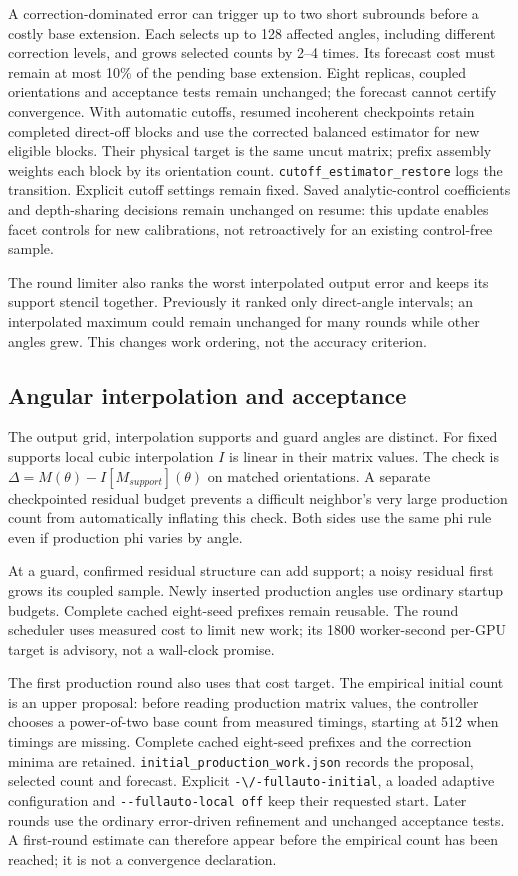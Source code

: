 A correction-dominated error can trigger up to two short subrounds
before a costly base extension. Each selects up to 128 affected angles,
including different correction levels, and grows selected counts by 2--4
times. Its forecast cost must remain at most 10\% of the pending base
extension. Eight replicas, coupled orientations and acceptance tests
remain unchanged; the forecast cannot certify convergence. With
automatic cutoffs, resumed incoherent checkpoints retain completed
direct-off blocks and use the corrected balanced estimator for new
eligible blocks. Their physical target is the same uncut matrix; prefix
assembly weights each block by its orientation count.
\nolinkurl{cutoff_estimator_restore} logs the transition. Explicit cutoff
settings remain fixed. Saved analytic-control coefficients and
depth-sharing decisions remain unchanged on resume: this update enables
facet controls for new calibrations, not retroactively for an existing
control-free sample.

The round limiter also ranks the worst interpolated output error and
keeps its support stencil together. Previously it ranked only
direct-angle intervals; an interpolated maximum could remain unchanged
for many rounds while other angles grew. This changes work ordering, not
the accuracy criterion.

\subsection{Angular interpolation and
acceptance}\label{angular-interpolation-and-acceptance}

The output grid, interpolation supports and guard angles are distinct.
For fixed supports local cubic interpolation \(I\) is linear in their
matrix values. The check is \(\Delta=M(\theta)-I[M_{support}](\theta)\)
on matched orientations. A separate checkpointed residual budget
prevents a difficult neighbor's very large production count from
automatically inflating this check. Both sides use the same phi rule
even if production phi varies by angle.

At a guard, confirmed residual structure can add support; a noisy
residual first grows its coupled sample. Newly inserted production
angles use ordinary startup budgets. Complete cached eight-seed prefixes
remain reusable. The round scheduler uses measured cost to limit new
work; its 1800 worker-second per-GPU target is advisory, not a
wall-clock promise.

The first production round also uses that cost target. The empirical
initial count is an upper proposal: before reading production matrix
values, the controller chooses a power-of-two base count from measured
timings, starting at 512 when timings are missing. Complete cached
eight-seed prefixes and the correction minima are retained.
\nolinkurl{initial_production_work.json} records the proposal, selected
count and forecast. Explicit \nolinkurl{-\/-fullauto-initial}, a loaded
adaptive configuration and \texttt{-\/-fullauto-local\ off} keep their
requested start. Later rounds use the ordinary error-driven refinement
and unchanged acceptance tests. A first-round estimate can therefore
appear before the empirical count has been reached; it is not a
convergence declaration.

